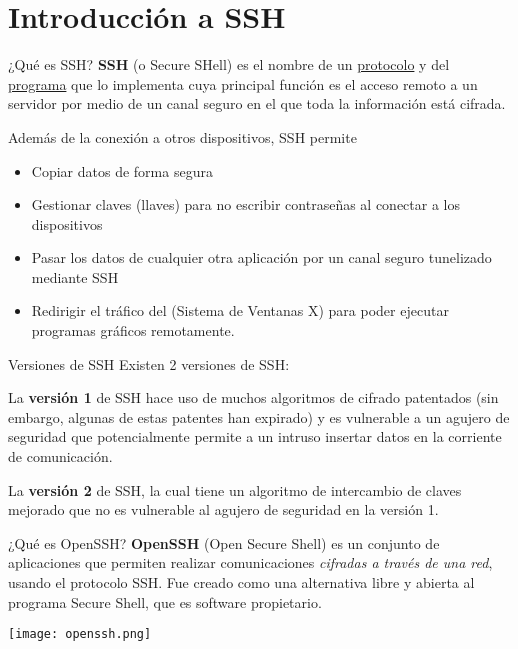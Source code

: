 
\section{Introducción a SSH}

\begin{frame}[c]{¿Qué es SSH?}
  \textbf{SSH} (o Secure SHell) es el nombre de un
  \underline{protocolo} y del \underline{programa} que
  lo implementa cuya principal función es el acceso remoto a un servidor
  por medio de un canal seguro en el que toda la información está cifrada.

  \vspace{\baselineskip}
  Además de la conexión a otros dispositivos, SSH permite
  \begin{itemize}
    \item Copiar datos de forma segura
    \pausa
    \item Gestionar claves (llaves) para no escribir contraseñas
      al conectar a los dispositivos 
    \pausa
    \item Pasar los datos de cualquier otra aplicación por un canal
      seguro tunelizado mediante SSH
    \pausa
    \item Redirigir el tráfico del (Sistema de Ventanas X) para poder
      ejecutar programas gráficos remotamente.
  \end{itemize}
\end{frame}

\begin{frame}[c]{Versiones de SSH}
  Existen 2 versiones de SSH:

  \vspace{\baselineskip}
  La \textbf{versión 1} de SSH hace uso de muchos algoritmos de
  cifrado patentados (sin embargo, algunas de estas patentes han
  expirado) y es vulnerable a un agujero de seguridad que
  potencialmente permite a un intruso insertar datos
  en la corriente de comunicación.

  \pausa
  \vspace{\baselineskip}
  La \textbf{versión 2} de SSH, la cual tiene un algoritmo de
  intercambio de claves mejorado que no es vulnerable al agujero
  de seguridad en la versión 1.
\end{frame}

\begin{frame}[c]{¿Qué es OpenSSH?}
  \textbf{OpenSSH} (Open Secure Shell) es un conjunto de aplicaciones
  que permiten realizar comunicaciones \emph{cifradas a través de una red},
  usando el protocolo SSH. Fue creado como una alternativa libre y
  abierta al programa Secure Shell, que es software propietario.
  \begin{center}
    \texttt{[image: openssh.png]}
  \end{center}
\end{frame}

